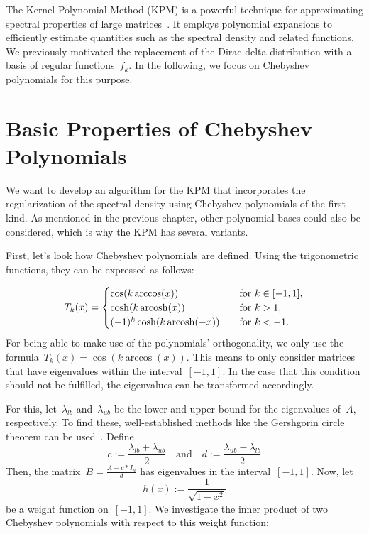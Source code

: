 The Kernel Polynomial Method (KPM) is a powerful technique for approximating spectral properties of large matrices~\cite{weisse2006,linsaadyang14}. It employs polynomial expansions to efficiently estimate quantities such as the spectral density and related functions. We previously motivated the replacement of the Dirac delta distribution with a basis of regular functions~$f_k$. In the following, we focus on Chebyshev polynomials for this purpose.

\section{Basic Properties of Chebyshev Polynomials}
We want to develop an algorithm for the KPM that incorporates the regularization of the spectral density using Chebyshev polynomials of the first kind. As mentioned in the previous chapter, other polynomial bases could also be considered, which is why the KPM has several variants.

First, let's look how Chebyshev polynomials are defined. Using the trigonometric functions, they can be expressed as follows:

\[ T_k(x) =
\begin{cases}
\cos(k \arccos(x))                & \quad \text{for } k \in [-1, 1],\\
    \cosh(k \operatorname{arcosh}(x))           & \quad \text{for } k > 1,\\
    (-1)^k \cosh(k \operatorname{arcosh}(-x))   & \quad \text{for } k < -1.
\end{cases}
\]
For being able to make use of the polynomials' orthogonality, we only use the formula~$T_k(x) = \cos(k \arccos(x))$. This means to only consider matrices that have eigenvalues within the interval~$[-1, 1]$. In the case that this condition should not be fulfilled, the eigenvalues can be transformed accordingly.

For this, let~$\lambda_{lb}$ and~$\lambda_{ub}$ be the lower and upper bound for the eigenvalues of~$A$, respectively. To find these, well-established methods like the Gershgorin circle theorem can be used~\cite{hornjohnson2013}. Define
\[
c := \frac{\lambda_{lb} + \lambda_{ub}}{2} \quad \text{and} \quad d := \frac{\lambda_{ub} - \lambda_{lb}}{2}
\]
Then, the matrix~$B = \frac{A - c*I_n}{d}$ has eigenvalues in the interval~$[-1, 1]$.
Now, let
\[
h(x) := \frac{1}{\sqrt{1 - x^2}}
\]
be a weight function on~$[-1, 1]$. We investigate the inner product of two Chebyshev polynomials with respect to this weight function:


